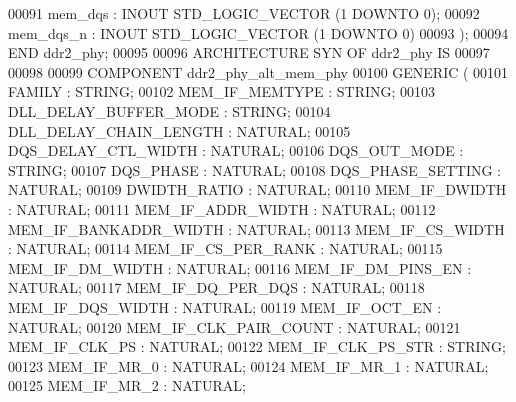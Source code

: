 \begin{DoxyCode}
{00091         \textcolor{vhdlchar}{mem_dqs} \textcolor{vhdlchar}{:} \textcolor{keywordflow}{INOUT} \textcolor{comment}{STD\_LOGIC\_VECTOR} \textcolor{vhdlchar}{(}\textcolor{vhdllogic}{}\textcolor{vhdllogic}{1} \textcolor{keywordflow}{DOWNTO} \textcolor{vhdllogic}{}\textcolor{vhdllogic}{0}\textcolor{vhdlchar}{)};
00092         \textcolor{vhdlchar}{mem_dqs_n}   \textcolor{vhdlchar}{:} \textcolor{keywordflow}{INOUT} \textcolor{comment}{STD\_LOGIC\_VECTOR} \textcolor{vhdlchar}{(}\textcolor{vhdllogic}{}\textcolor{vhdllogic}{1} \textcolor{keywordflow}{DOWNTO} \textcolor{vhdllogic}{}\textcolor{vhdllogic}{0}\textcolor{vhdlchar}{)}
00093     \textcolor{vhdlchar}{)};
00094 \textcolor{keywordflow}{END} \textcolor{vhdlchar}{ddr2\_phy};
00095 
00096 \textcolor{keywordflow}{ARCHITECTURE} SYN \textcolor{keywordflow}{OF} ddr2_phy IS
00097 
00098 
00099     \textcolor{keywordflow}{COMPONENT} ddr2\_phy\_alt\_mem\_phy
00100     \textcolor{keywordflow}{GENERIC} (
00101         FAMILY  : \textcolor{comment}{STRING};
00102         MEM\_IF\_MEMTYPE  : \textcolor{comment}{STRING};
00103         DLL\_DELAY\_BUFFER\_MODE   : \textcolor{comment}{STRING};
00104         DLL\_DELAY\_CHAIN\_LENGTH  : \textcolor{comment}{NATURAL};
00105         DQS\_DELAY\_CTL\_WIDTH : \textcolor{comment}{NATURAL};
00106         DQS\_OUT\_MODE    : \textcolor{comment}{STRING};
00107         DQS\_PHASE   : \textcolor{comment}{NATURAL};
00108         DQS\_PHASE\_SETTING   : \textcolor{comment}{NATURAL};
00109         DWIDTH\_RATIO    : \textcolor{comment}{NATURAL};
00110         MEM\_IF\_DWIDTH   : \textcolor{comment}{NATURAL};
00111         MEM\_IF\_ADDR\_WIDTH   : \textcolor{comment}{NATURAL};
00112         MEM\_IF\_BANKADDR\_WIDTH   : \textcolor{comment}{NATURAL};
00113         MEM\_IF\_CS\_WIDTH : \textcolor{comment}{NATURAL};
00114         MEM\_IF\_CS\_PER\_RANK  : \textcolor{comment}{NATURAL};
00115         MEM\_IF\_DM\_WIDTH : \textcolor{comment}{NATURAL};
00116         MEM\_IF\_DM\_PINS\_EN   : \textcolor{comment}{NATURAL};
00117         MEM\_IF\_DQ\_PER\_DQS   : \textcolor{comment}{NATURAL};
00118         MEM\_IF\_DQS\_WIDTH    : \textcolor{comment}{NATURAL};
00119         MEM\_IF\_OCT\_EN   : \textcolor{comment}{NATURAL};
00120         MEM\_IF\_CLK\_PAIR\_COUNT   : \textcolor{comment}{NATURAL};
00121         MEM\_IF\_CLK\_PS   : \textcolor{comment}{NATURAL};
00122         MEM\_IF\_CLK\_PS\_STR   : \textcolor{comment}{STRING};
00123         MEM\_IF\_MR\_0 : \textcolor{comment}{NATURAL};
00124         MEM\_IF\_MR\_1 : \textcolor{comment}{NATURAL};
00125         MEM\_IF\_MR\_2 : \textcolor{comment}{NATURAL};
}
\end{DoxyCode}
